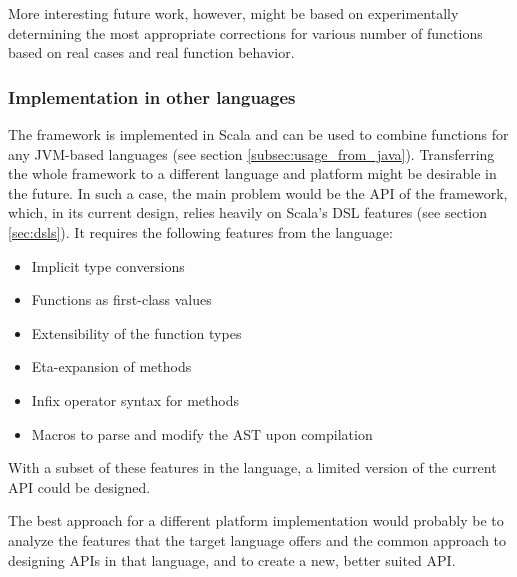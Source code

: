 More interesting future work, however, might be based on experimentally determining the most appropriate corrections for various number of functions based on real cases and real function behavior.

\subsubsection{Implementation in other languages}

The framework is implemented in Scala and can be used to combine functions for any JVM-based languages (see section \ref{subsec:usage_from_java}). Transferring the whole framework to a different language and platform might be desirable in the future. In such a case, the main problem would be the API of the framework, which, in its current design, relies heavily on Scala's DSL features (see section \ref{sec:dsls}). It requires the following features from the language:

\begin{itemize}
	\item Implicit type conversions
	\item Functions as first-class values
	\item Extensibility of the function types
	\item Eta-expansion of methods
	\item Infix operator syntax for methods
	\item Macros to parse and modify the AST upon compilation
\end{itemize}

With a subset of these features in the language, a limited version of the current API could be designed. 

The best approach for a different platform implementation would probably be to analyze the features that the target language offers and the common approach to designing APIs in that language, and to create a new, better suited API.